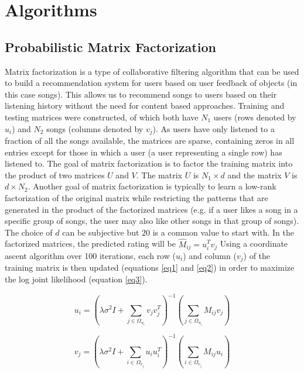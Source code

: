 \documentclass[11pt,preprint]{aastex}
\newcommand{\TRANSPOSE}{\ensuremath{T}}
\begin{document}
\section{Algorithms}

\subsection{Probabilistic Matrix Factorization}
Matrix factorization is a type of collaborative filtering algorithm that can be used to build a recommendation system for users based on user feedback of objects (in this case songs). This allows us to recommend songs to users based on their listening history without the need for content based approaches. 
Training and testing matrices were constructed, of which both have $N_1$ users (rows denoted by $u_i$) and $N_2$ songs (columns denoted by $v_j$). As users have only listened to a fraction of all the songs available, the matrices are sparse, containing zeros in all entries except for those in which a user (a user representing a single row) has listened to. The goal of matrix factorization is to factor the training matrix into the product of two matrices $U$ and $V$.  The matrix $U$ is $N_1 \times d$ and the matrix $V$ is $d \times N_2$. Another goal of matrix factorization is typically to learn a low-rank factorization of the original matrix while restricting the patterns that are generated in the product of the factorized matrices (e.g. if a user likes a song in a specific group of songs, the user may also like other songs in that group of songs). The choice of $d$ can be subjective but $20$ is a common value to start with. In the factorized matrices, the predicted rating will be $\hat{M}_{ij} = u_i^\TRANSPOSE  v_j$
Using a coordinate ascent algorithm over 100 iterations, each row ($u_i$) and column ($v_j$) of the training matrix is then updated (equations \ref{eq1} and \ref{eq2}) in order to maximize the log joint likelihood (equation \ref{eq3}).

\begin{equation}
u_i = \left( \lambda\sigma^2 I + \sum_{j \in \Omega_{u_i}} v_j v_j^\TRANSPOSE \right)^{-1}\left(\sum_{j \in \Omega_{u_i}} M_{ij} v_{j} \right)
\label{eq1}
\end{equation}

\begin{equation}
v_j = \left( \lambda\sigma^2 I + \sum_{i \in \Omega_{v_j}} u_i u_i^\TRANSPOSE  \right)^{-1}\left(\sum_{i \in \Omega_{v_j}} M_{ij} u_{i} \right)
\label{eq2}
\end{equation}
\end{document}

